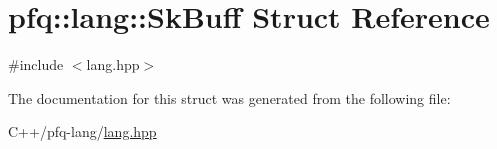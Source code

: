 \hypertarget{structpfq_1_1lang_1_1SkBuff}{\section{pfq\+:\+:lang\+:\+:Sk\+Buff Struct Reference}
\label{structpfq_1_1lang_1_1SkBuff}
}


{\ttfamily \#include $<$lang.\+hpp$>$}



The documentation for this struct was generated from the following file\+:\begin{DoxyCompactItemize}
\item 
C++/pfq-\/lang/\hyperlink{lang_8hpp}{lang.\+hpp}\end{DoxyCompactItemize}
